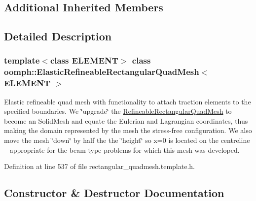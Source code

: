 \subsection*{Additional Inherited Members}


\subsection{Detailed Description}
\subsubsection*{template$<$class E\+L\+E\+M\+E\+NT$>$\newline
class oomph\+::\+Elastic\+Refineable\+Rectangular\+Quad\+Mesh$<$ E\+L\+E\+M\+E\+N\+T $>$}

Elastic refineable quad mesh with functionality to attach traction elements to the specified boundaries. We \char`\"{}upgrade\char`\"{} the \hyperlink{classoomph_1_1RefineableRectangularQuadMesh}{Refineable\+Rectangular\+Quad\+Mesh} to become an Solid\+Mesh and equate the Eulerian and Lagrangian coordinates, thus making the domain represented by the mesh the stress-\/free configuration. We also move the mesh \char`\"{}down\char`\"{} by half the the \char`\"{}height\char`\"{} so x=0 is located on the centreline -- appropriate for the beam-\/type problems for which this mesh was developed. 

Definition at line 537 of file rectangular\+\_\+quadmesh.\+template.\+h.



\subsection{Constructor \& Destructor Documentation}
\mbox{\label{classoomph_1_1ElasticRefineableRectangularQuadMesh_aa3d9df728974ce172bf942bc4f6c1a2d}} 
